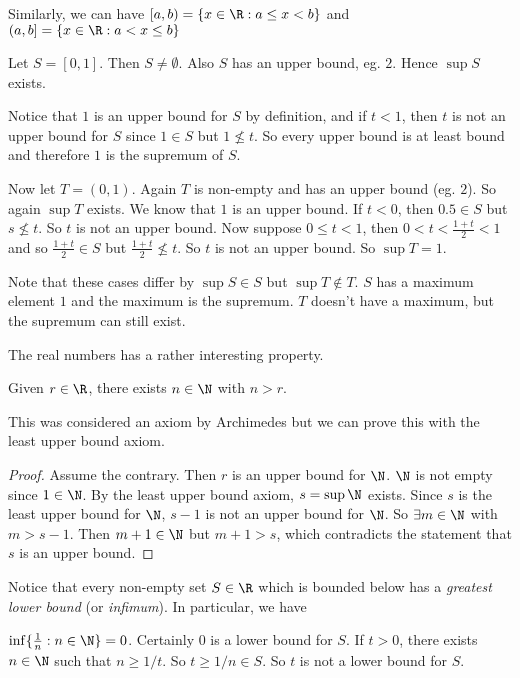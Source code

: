 \documentclass[a4paper]{article}
\begin{document}
Similarly, we can have $[a, b) = \{x\in \R: a\leq x < b\}$ and $(a, b] = \{x\in \R: a< x \leq b\}$

\begin{eg}
  Let $S = [0, 1]$. Then $S\not= \emptyset$. Also $S$ has an upper bound, eg. $2$. Hence $\sup S$ exists.

  Notice that $1$ is an upper bound for $S$ by definition, and if $t < 1$, then $t$ is not an upper bound for $S$ since $1\in S$ but $1\not\leq t$. So every upper bound is at least bound and therefore $1$ is the supremum of $S$.

  Now let $T = (0, 1)$. Again $T$ is non-empty and has an upper bound (eg. $2$). So again $\sup T$ exists. We know that $1$ is an upper bound. If $t < 0$, then $0.5\in S$ but $s\not\leq t$. So $t$ is not an upper bound. Now suppose $0\leq t < 1$, then $0 < t < \frac{1 + t}{2} < 1$ and so $\frac{1 + t}{2}\in S$ but $\frac{1 + t}{2} \not\leq t$. So $t$ is not an upper bound. So $\sup T = 1$.

  Note that these cases differ by $\sup S\in S$ but $\sup T\not\in T$. $S$ has a maximum element $1$ and the maximum is the supremum. $T$ doesn't have a maximum, but the supremum can still exist.

\end{eg}

The real numbers has a rather interesting property.
\begin{thm}
  Given $r\in \R$, there exists $n\in \N$ with $n > r$.
\end{thm}

This was considered an axiom by Archimedes but we can prove this with the least upper bound axiom.

\begin{proof}
  Assume the contrary. Then $r$ is an upper bound for $\N$. $\N$ is not empty since $1\in \N$. By the least upper bound axiom, $s = \sup \N$ exists. Since $s$ is the least upper bound for $\N$, $s - 1$ is not an upper bound for $\N$. So $\exists m\in \N$ with $m > s - 1$. Then $m + 1\in \N$ but $m + 1 > s$, which contradicts the statement that $s$ is an upper bound.
\end{proof}

Notice that every non-empty set $S\in \R$ which is bounded below has a \emph{greatest lower bound} (or \emph{infimum}). In particular, we have

\begin{prop}
  $\inf\{\frac{1}{n}: n\in \N\} = 0$.
  Certainly $0$ is a lower bound for $S$. If $t > 0$, there exists $n \in \N$ such that $n \geq 1/t$. So $t \geq 1/n\in S$. So $t$ is not a lower bound for $S$.
\end{prop}
\end{document}
